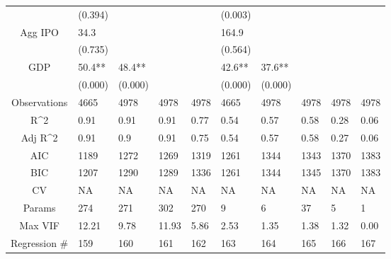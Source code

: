 \documentclass{article}
\begin{document}
\begin{table}[H]
\begin{tabular}{|clllllllll|}
   & (0.394) &  &  &  & (0.003) &  &  &  &  \\
  Agg IPO & 34.3 &  &  &  & 164.9 &  &  &  &  \\
   & (0.735) &  &  &  & (0.564) &  &  &  &  \\
  GDP & 50.4** & 48.4** &  &  & 42.6** & 37.6** &  &  &  \\
   & (0.000) & (0.000) &  &  & (0.000) & (0.000) &  &  &  \\
  \hline
 Observations & 4665 & 4978 & 4978 & 4978 & 4665 & 4978 & 4978 & 4978 & 4978 \\
  R^2 & 0.91 & 0.91 & 0.91 & 0.77 & 0.54 & 0.57 & 0.58 & 0.28 & 0.06 \\
  Adj R^2 & 0.91 & 0.9 & 0.91 & 0.75 & 0.54 & 0.57 & 0.58 & 0.27 & 0.06 \\
  AIC & 1189 & 1272 & 1269 & 1319 & 1261 & 1344 & 1343 & 1370 & 1383 \\
  BIC & 1207 & 1290 & 1289 & 1336 & 1261 & 1344 & 1345 & 1370 & 1383 \\
  CV & NA & NA & NA & NA & NA & NA & NA & NA & NA \\
  Params & 274 & 271 & 302 & 270 & 9 & 6 & 37 & 5 & 1 \\
  Max VIF & 12.21 & 9.78 & 11.93 & 5.86 & 2.53 & 1.35 & 1.38 & 1.32 & 0.00 \\
  Regression \# & 159 & 160 & 161 & 162 & 163 & 164 & 165 & 166 & 167 \\
   \hline
\end{tabular}

\end{table}
\end{document}
